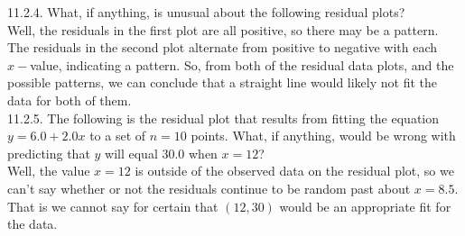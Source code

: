 \documentclass[12pt]{article}
\begin{document}
11.2.4. What, if anything, is unusual about the following residual plots?\\
Well, the residuals in the first plot are all positive, so there may be a pattern. The residuals in the second plot alternate from positive to negative with each $x-$value, indicating a pattern. So, from both of the residual data plots, and the possible patterns, we can conclude that a straight line would likely not fit the data for both of them.\\[20pt]

11.2.5. The following is the residual plot that results from fitting the equation $y=6.0+2.0x$ to a set of $n=10$ points. What, if anything, would be wrong with predicting that $y$ will equal 30.0 when $x=12$?\\
Well, the value $x=12$ is outside of the observed data on the residual plot, so we can't say whether or not the residuals continue to be random past about $x=8.5$. That is we cannot say for certain that $(12,30)$ would be an appropriate fit for the data.
\end{document}
